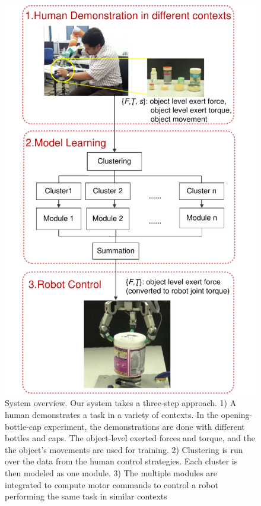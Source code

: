 \begin{figure}
  \centering
   \includegraphics[width=15cm]{./fig_cha4/overview3.pdf}
  \caption{ \scriptsize{System overview. Our system takes a
       three-step approach. 1) A human demonstrates a task in a
       variety of contexts. In the opening-bottle-cap experiment, the
       demonstrations are done with different bottles and caps. The
       object-level exerted forces and torque, and the the object's
       movements are used for training. 2) Clustering is run over the data from the human control
       strategies. Each cluster is then modeled as one module. 3) The
       multiple modules are integrated to compute motor commands to
       control a robot performing the same task in similar contexts}
  \label{fig:overview}
}
\label{fig:demo}
\end{figure}

